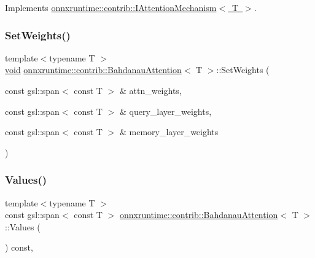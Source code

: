 Implements \mbox{\hyperlink{classonnxruntime_1_1contrib_1_1IAttentionMechanism_a9b56c5b71af342077b483c762fc2e724}{onnxruntime\+::contrib\+::\+I\+Attention\+Mechanism$<$ T $>$}}.

\mbox{\label{classonnxruntime_1_1contrib_1_1BahdanauAttention_ad112084986ececc5b02cd220618c7b50}} 
\subsubsection{\texorpdfstring{Set\+Weights()}{SetWeights()}}
{\footnotesize\ttfamily template$<$typename T $>$ \\
\mbox{\hyperlink{mlasi_8h_a88f941d423cb2a819b70a1358982b1a6}{void}} \mbox{\hyperlink{classonnxruntime_1_1contrib_1_1BahdanauAttention}{onnxruntime\+::contrib\+::\+Bahdanau\+Attention}}$<$ T $>$\+::Set\+Weights (\begin{DoxyParamCaption}\item[{const gsl\+::span$<$ const T $>$ \&}]{attn\+\_\+weights,  }\item[{const gsl\+::span$<$ const T $>$ \&}]{query\+\_\+layer\+\_\+weights,  }\item[{const gsl\+::span$<$ const T $>$ \&}]{memory\+\_\+layer\+\_\+weights }\end{DoxyParamCaption})}

\mbox{\label{classonnxruntime_1_1contrib_1_1BahdanauAttention_af6a80756c3478056a61d6513e586ea8b}} 
\subsubsection{\texorpdfstring{Values()}{Values()}}
{\footnotesize\ttfamily template$<$typename T $>$ \\
const gsl\+::span$<$ const T $>$ \mbox{\hyperlink{classonnxruntime_1_1contrib_1_1BahdanauAttention}{onnxruntime\+::contrib\+::\+Bahdanau\+Attention}}$<$ T $>$\+::Values (\begin{DoxyParamCaption}{ }\end{DoxyParamCaption}) const\hspace{0.3cm}{\ttfamily [override]}, {\ttfamily [virtual]}}



